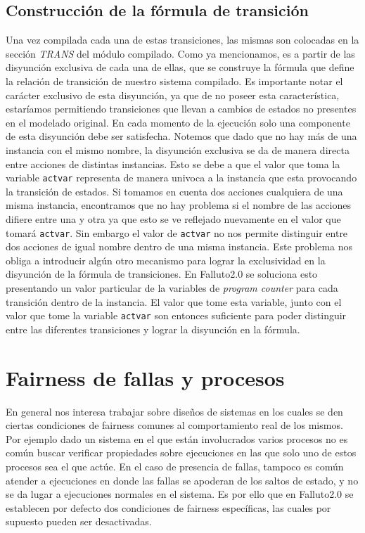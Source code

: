 \documentclass[titlepage, 12pt]{book}
\begin{document}
\subsection*{Construcci\'on de la f\'ormula de transici\'on}
Una vez compilada cada una de estas transiciones, las mismas son colocadas en la secci\'on \textit{TRANS} del m\'odulo compilado. Como ya mencionamos, es a partir de las disyunci\'on exclusiva de cada una de ellas, que se construye la f\'ormula que define la relaci\'on de transici\'on de nuestro sistema compilado. Es importante notar el car\'acter exclusivo de esta disyunci\'on, ya que de no poseer esta caracter\'istica, estar\'iamos permitiendo transiciones que llevan a cambios de estados no presentes en el modelado original. En cada momento de la ejecuci\'on solo una componente de esta disyunci\'on debe ser satisfecha. Notemos que dado que no hay m\'as de una instancia con el mismo nombre, la disyunci\'on exclusiva se da de manera directa entre acciones de distintas instancias. Esto se debe a que el valor que toma la variable \texttt{actvar} representa de manera univoca a la instancia que esta provocando la transici\'on de estados. Si tomamos en cuenta dos acciones cualquiera de una misma instancia, encontramos que no hay problema si el nombre de las acciones difiere entre una y otra ya que esto se ve reflejado nuevamente en el valor que tomar\'a \texttt{actvar}. Sin embargo el valor de \texttt{actvar} no nos permite distinguir entre dos acciones de igual nombre dentro de una misma instancia. Este problema nos obliga a introducir alg\'un otro mecanismo para lograr la exclusividad en la disyunci\'on de la f\'ormula de transiciones. En Falluto2.0 se soluciona esto presentando un valor particular de la variables de \textit{program counter} para cada transici\'on dentro de la instancia. El valor que tome esta variable, junto con el valor que tome la variable \texttt{actvar} son entonces suficiente para poder distinguir entre las diferentes transiciones y lograr la disyunci\'on en la f\'ormula.

\section{Fairness de fallas y procesos}
En general nos interesa trabajar sobre dise\~nos de sistemas en los cuales se den ciertas condiciones de fairness comunes al comportamiento real de los mismos. Por ejemplo dado un sistema en el que est\'an involucrados varios procesos no es com\'un buscar verificar propiedades sobre ejecuciones en las que solo uno de estos procesos sea el que act\'ue. En el caso de presencia de fallas, tampoco es com\'un atender a ejecuciones en donde las fallas se apoderan de los saltos de estado, y no se da lugar a ejecuciones normales en el sistema. Es por ello que en Falluto2.0 se establecen por defecto dos condiciones de fairness espec\'ificas, las cuales por supuesto pueden ser desactivadas.
\end{document}
